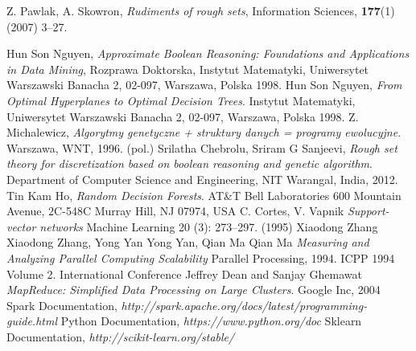 \documentclass[magisterska]{pracamgr}
\theoremstyle{plain}
\theoremstyle{definition}
\theoremstyle{remark}
\begin{document}
\begin{thebibliography}{9}

Z. Pawlak, A. Skowron,
\emph{Rudiments of rough sets},
Information Sciences, {\bf 177}(1) (2007) 3--27.

  Hun Son Nguyen,
  \emph{Approximate Boolean Reasoning: Foundations and Applications in Data Mining},
  Rozprawa Doktorska, Instytut Matematyki, Uniwersytet Warszawski Banacha 2, 02-097, Warszawa, Polska
  1998.
  Hun Son Nguyen,
  \emph{From Optimal Hyperplanes to Optimal Decision Trees}.
  Instytut Matematyki, Uniwersytet Warszawski Banacha 2, 02-097, Warszawa, Polska
  1998.
  Z. Michalewicz, 
  \emph{Algorytmy genetyczne + struktury danych = programy ewolucyjne}.
  Warszawa, WNT, 
  1996. (pol.)
  Srilatha Chebrolu, Sriram G Sanjeevi,
  \emph{Rough set theory for discretization based on boolean reasoning and 
  genetic algorithm}.
  Department of Computer Science and Engineering, NIT Warangal, India,
  2012.
  Tin Kam Ho,
  \emph{Random Decision Forests}.
  AT\&T Bell Laboratories 600 Mountain Avenue, 2C-548C Murray Hill, NJ 07974, USA
  C. Cortes, V. Vapnik
  \emph{Support-vector networks}
  Machine Learning 20 (3): 273–297. (1995)
  Xiaodong Zhang Xiaodong Zhang, Yong Yan Yong Yan, Qian Ma Qian Ma
  \emph{Measuring and Analyzing Parallel Computing Scalability}
  Parallel Processing, 1994. ICPP 1994 Volume 2. International Conference
Jeffrey Dean and Sanjay Ghemawat
\emph{MapReduce: Simplified Data Processing on Large Clusters}.
Google Inc, 2004
 Spark Documentation,
 \emph{http://spark.apache.org/docs/latest/programming-guide.html}
 Python Documentation,
 \emph{https://www.python.org/doc}
 Sklearn Documentation,
 \emph{http://scikit-learn.org/stable/}
 
\end{thebibliography}
 
\end{document}
